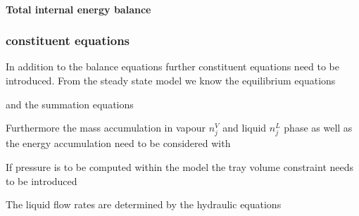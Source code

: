     \paragraph{Total internal energy balance}
     
\subsubsection{constituent equations}
    In addition to the balance equations further constituent equations need to be introduced. From the
    steady state model we know the equilibrium equations 
    
    and the summation equations
    

    Furthermore the mass accumulation in vapour $n_j^V$ and liquid $n_j^L$ phase as well as the energy accumulation 
    need to be considered with 
    

    If pressure is to be computed within the model the tray volume constraint needs to 
    be introduced
    

    The liquid flow rates are determined by the hydraulic equations 
    
